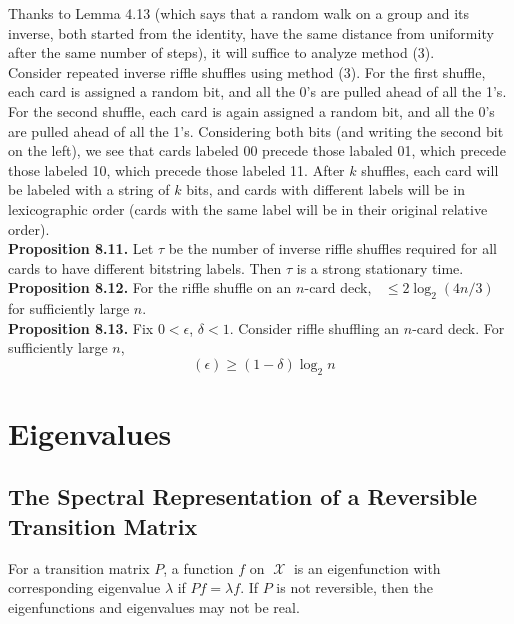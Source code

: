 \documentclass[12pt]{article}
\DeclareMathOperator*{\mix}{t_{\text{mix}}}
\DeclareMathOperator*{\X}{\mathcal{X}}
\begin{document}
Thanks to Lemma 4.13 (which says that a random walk on a group and its inverse, both started from the identity, have the same distance from uniformity after the same number of steps), it will suffice to analyze method (3).\\

Consider repeated inverse riffle shuffles using method (3). For the first shuffle, each card is assigned a random bit, and all the 0's are pulled ahead of all the 1's. For the second shuffle, each card is again assigned a random bit, and all the 0's are pulled ahead of all the 1's. Considering both bits (and writing the second bit on the left), we see that cards labeled 00 precede those labaled 01, which precede those labeled 10, which precede those labeled 11. After $k$ shuffles, each card will be labeled with a string of $k$ bits, and cards with different labels will be in lexicographic order (cards with the same label will be in their original relative order).\\

\textbf{Proposition 8.11.} Let $\tau$ be the number of inverse riffle shuffles required for all cards to have different bitstring labels. Then $\tau$ is a strong stationary time.\\

\textbf{Proposition 8.12.} For the riffle shuffle on an $n$-card deck, $\mix \leq 2 \log_2 (4n/3)$ for sufficiently large $n$.\\

\textbf{Proposition 8.13.} Fix $0 < \epsilon$, $\delta < 1$. Consider riffle shuffling an $n$-card deck. For sufficiently large $n$, $$\mix(\epsilon) \geq (1 - \delta) \log_2 n$$


\section{Eigenvalues}

\subsection{The Spectral Representation of a Reversible Transition Matrix}

For a transition matrix $P$, a function $f$ on $\X$ is an eigenfunction with corresponding eigenvalue $\lambda$ if $Pf = \lambda f$. If $P$ is not reversible, then the eigenfunctions and eigenvalues may not be real.\\
\end{document}
